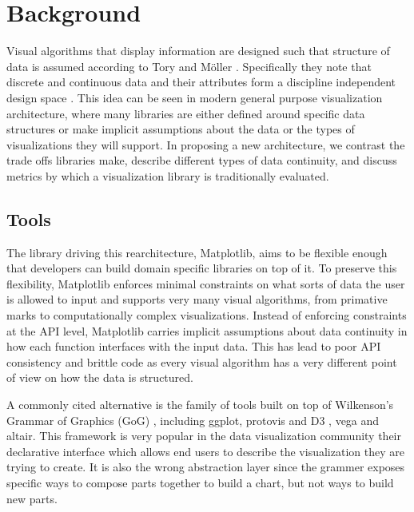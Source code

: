 \documentclass[../main.tex]{subfiles}
\begin{document}
\section{Background}
Visual algorithms that display information are designed such that structure of data is assumed according to Tory and Möller  \cite{toryRethinkingVisualizationHighLevel2004}. Specifically they note that discrete and continuous data and their attributes form a discipline independent design space \cite{pousmanCasualInformation2007}. This idea can be seen in modern general purpose visualization architecture,  where many libraries are either defined around specific data structures or make implicit assumptions about the data or the types of visualizations they will support. In proposing a new architecture, we contrast the trade offs libraries make, describe different types of data continuity, and discuss metrics by which a visualization library is traditionally evaluated. 

\subsection{Tools}
\label{sec:intro_data_tools}
The library driving this rearchitecture, Matplotlib, aims to be flexible enough that developers can build domain specific libraries on top of it. To preserve this flexibility, Matplotlib enforces minimal constraints on what sorts of data the user is allowed to input and supports very many visual algorithms, from primative marks to computationally complex visualizations. Instead of enforcing constraints at the API level, Matplotlib carries implicit assumptions about data continuity in how each function interfaces with the input data. This has lead to poor API consistency and brittle code as every visual algorithm has a very different point of view on how the data is structured. 

A commonly cited alternative is the family of tools built on top of Wilkenson's Grammar of Graphics (GoG) \cite{wilkinsonGrammarGraphics2005}, including ggplot\cite{wickhamGgplot2ElegantGraphics2016a}, protovis\cite{bostockProtoviz2009} and D3 \cite{bostockDataDrivenDocuments2011}, vega\cite{satyanarayanDeclarativeInteractionDesign2014} and altair\cite{vanderplasAltairInteractiveStatistical2018}. This framework is very popular in the data visualization community their declarative interface \cite{heerDeclarative2010} which allows end users to describe the visualization they are trying to create. It is also the wrong abstraction layer since the grammer exposes specific ways to compose parts together to build a chart, but not ways to build new parts\cite{wongsuphasawatNavigatingWideWorld2021}.
\end{document}
